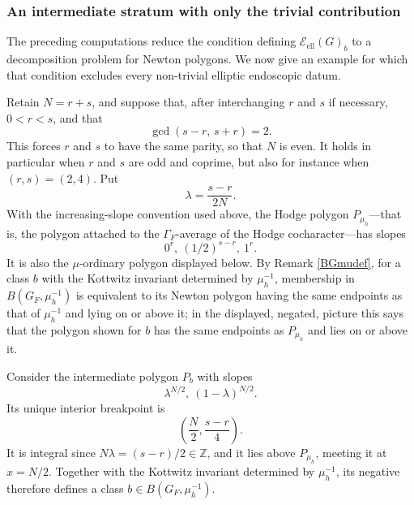 \documentclass[11pt,a4paper]{article}
\newcommand{\Eell}{\mathcal{E}_{\mathrm{ell}}}
\theoremstyle{definition}
\theoremstyle{plain}
\theoremstyle{remark}
\theoremstyle{plain}
\begin{document}
\subsubsection{An intermediate stratum with only the trivial contribution}
The preceding computations reduce the condition defining $\Eell(G)_b$ to a decomposition problem for Newton polygons. We now give an example for which that condition excludes every non-trivial elliptic endoscopic datum.

Retain $N=r+s$, and suppose that, after interchanging $r$ and $s$ if necessary, $0<r<s$, and that
$$
\gcd(s-r,\,s+r)=2.
$$
This forces $r$ and $s$ to have the same parity, so that $N$ is even. It holds in particular when $r$ and $s$ are odd and coprime, but also for instance when $(r,s)=(2,4)$. Put
$$
\lambda=\frac{s-r}{2N}.
$$
With the increasing-slope convention used above, the Hodge polygon $P_{\mu_h}$---that is, the polygon attached to the $\Gamma_F$-average of the Hodge cocharacter---has slopes
$$
0^r,\ (1/2)^{s-r},\ 1^r.
$$
It is also the $\mu$-ordinary polygon displayed below. By Remark \ref{BGmudef}, for a class $b$ with the Kottwitz invariant determined by $\mu_h^{-1}$, membership in $B(G_F,\mu_h^{-1})$ is equivalent to its Newton polygon having the same endpoints as that of $\mu_h^{-1}$ and lying on or above it; in the displayed, negated, picture this says that the polygon shown for $b$ has the same endpoints as $P_{\mu_h}$ and lies on or above it.

Consider the intermediate polygon $P_b$ with slopes
$$
\lambda^{N/2},\ (1-\lambda)^{N/2}.
$$
Its unique interior breakpoint is
$$
\left(\frac N2,\frac{s-r}{4}\right).
$$
It is integral since $N\lambda=(s-r)/2\in\mathbb Z$, and it lies above $P_{\mu_h}$, meeting it at $x=N/2$. Together with the Kottwitz invariant determined by $\mu_h^{-1}$, its negative therefore defines a class $b\in B(G_F,\mu_h^{-1})$.
\end{document}
